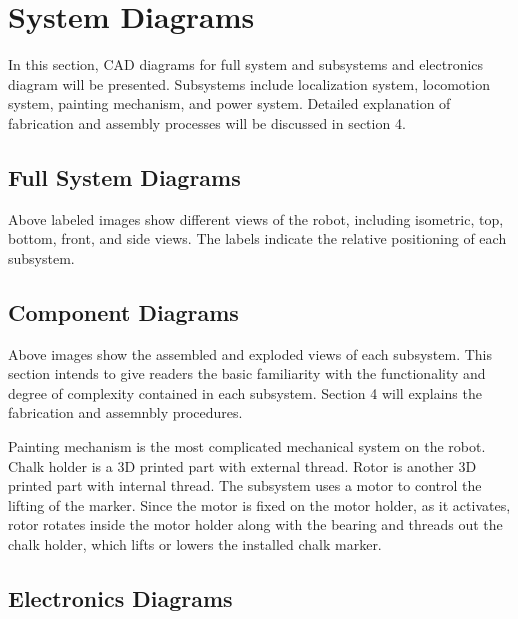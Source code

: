 
\section{System Diagrams}
\label{sec:system_diagrams}

In this section, CAD diagrams for full system and subsystems and electronics diagram will be presented. Subsystems include localization system, locomotion system, painting mechanism, and power system. Detailed explanation of fabrication and assembly processes will be discussed in section 4. 

\subsection{Full System Diagrams}
\label{sec:full_sys_diagrams}

Above labeled images show different views of the robot, including isometric, top, bottom, front, and side views. The labels indicate the relative positioning of each subsystem. 

\subsection{Component Diagrams}
\label{sec:component_diagrams}

Above images show the assembled and exploded views of each subsystem. This section intends to give readers the basic familiarity with the functionality and degree of complexity contained in each subsystem. Section 4 will explains the fabrication and assemnbly procedures. 

Painting mechanism is the most complicated mechanical system on the robot. Chalk holder is a 3D printed part with external thread. Rotor is another 3D printed part with internal thread. The subsystem uses a motor to control the lifting of the marker. Since the motor is fixed on the motor holder, as it activates, rotor rotates inside the motor holder along with the bearing and threads out the chalk holder, which lifts or lowers the installed chalk marker.

\subsection{Electronics Diagrams}
\label{sec:electronics_diagrams}